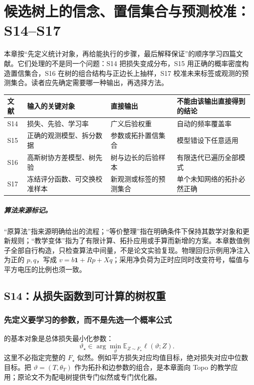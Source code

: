 \chapter{候选树上的信念、置信集合与预测校准：S14--S17}
\label{chap:statistical-textbook}

本章按“先定义统计对象，再给能执行的步骤，最后解释保证”的顺序学习四篇文献。它们处理的不是同一个问题：S14 把损失变成分布，S15 用正确的概率密度构造置信集合，S16 在树的组合结构与正边长上抽样，S17 校准未来标签或观测的预测集合。读者应先确定需要哪一种输出，再选择方法。

\begin{center}
\begin{tabularx}{\linewidth}{lXXX}
\toprule
文献 & 输入的关键对象 & 直接输出 & 不能由该输出直接得到的结论\\
\midrule
S14 & 损失、先验、学习率 & 广义后验权重 & 自动的频率覆盖率\\
S15 & 正确的观测模型、拆分数据 & 参数或拓扑置信集合 & 模型错设下任意适用\\
S16 & 高斯树协方差模型、树先验 & 树与边长的后验样本 & 有限迭代已遍历全部模式\\
S17 & 冻结评分函数、可交换校准样本 & 新观测或标签的预测集合 & 单个未知网络的拓扑必然正确\\
\bottomrule
\end{tabularx}
\end{center}

\paragraph{算法来源标记。}
“原算法”指来源明确给出的流程；“等价整理”指在明确条件下保持其数学对象和更新规则；“教学变体”指为了有限计算、拓扑应用或手算而新增的方案。本章数值例子全部自行构造，只检查算法中间量，不是论文实验复现。物理回归示例用净注入为正的 $p,q$，写成 $v=b\mathbf1+Rp+Xq$；采用净负荷为正时应同时改变符号，幅值与平方电压的比例也须一致。

\section{S14：从损失函数到可计算的树权重}
\label{sec:textbook-S14}

\subsection{先定义要学习的参数，而不是先选一个概率公式}

\citet{S14} 的基本对象是总体损失最小化参数：
\[
 \vartheta_\star\in\arg\min_{\vartheta}
 \mathbb E_{Z\sim F_\star}\ell(\vartheta;Z).
\]
这里不必指定完整的 $F_\star$ 似然。例如平方损失对应均值目标，绝对损失对应中位数目标。把 $\vartheta=(T,\theta_T)$ 作为拓扑和边参数的组合，是本章面向 Topo 的教学应用；原论文不为配电树提供专门似然或专门优化器。

